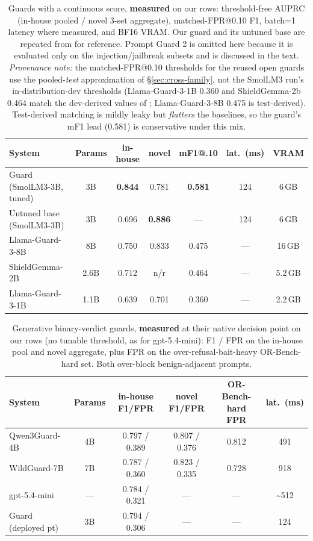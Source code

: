 \begin{table}[t]
\small\centering\setlength{\tabcolsep}{4pt}
\caption{Guards with a continuous score, \textbf{measured} on our rows: threshold-free AUPRC (in-house pooled / novel 3-set aggregate), matched-FPR@0.10 F1, batch=1 latency where measured, and BF16 VRAM. Our guard and its untuned base are repeated from  for reference. Prompt Guard 2 is omitted here because it is evaluated only on the injection/jailbreak subsets and is discussed in the text. \emph{Provenance note:} the matched-FPR@0.10 thresholds for the reused open guards use the pooled-\emph{test} approximation of \S\ref{sec:cross-family}, not the SmolLM3 run's in-distribution-dev thresholds (Llama-Guard-3-1B 0.360 and ShieldGemma-2b 0.464 match the dev-derived values of ; Llama-Guard-3-8B 0.475 is test-derived). Test-derived matching is mildly leaky but \emph{flatters} the baselines, so the guard's mF1 lead (0.581) is conservative under this mix.}
\label{tab:gr-auprc}
\begin{tabular}{lcccccc}
\toprule
System & Params & in-house & novel & mF1@.10 & lat.\ (ms) & VRAM \\
\midrule
Guard (SmolLM3-3B, tuned) & 3B & \textbf{0.844} & 0.781 & \textbf{0.581} & 124 & 6\,GB \\
Untuned base (SmolLM3-3B) & 3B & 0.696 & \textbf{0.886} & --- & 124 & 6\,GB \\
Llama-Guard-3-8B          & 8B & 0.750 & 0.833 & 0.475 & --- & 16\,GB \\
ShieldGemma-2B            & 2.6B & 0.712 & n/r & 0.464 & --- & 5.2\,GB \\
Llama-Guard-3-1B          & 1.1B & 0.639 & 0.701 & 0.360 & --- & 2.2\,GB \\
\bottomrule
\end{tabular}
\end{table}

\begin{table}[t]
\small\centering\setlength{\tabcolsep}{4pt}
\caption{Generative binary-verdict guards, \textbf{measured} at their native decision point on our rows (no tunable threshold, as for gpt-5.4-mini): F1 / FPR on the in-house pool and novel aggregate, plus FPR on the over-refusal-bait-heavy OR-Bench-hard set. Both over-block benign-adjacent prompts.}
\label{tab:gr-native}
\begin{tabular}{lccccc}
\toprule
System & Params & in-house F1/FPR & novel F1/FPR & OR-Bench-hard FPR & lat.\ (ms) \\
\midrule
Qwen3Guard-4B & 4B & 0.797 / 0.389 & 0.807 / 0.376 & 0.812 & 491 \\
WildGuard-7B  & 7B & 0.787 / 0.360 & 0.823 / 0.335 & 0.728 & 918 \\
gpt-5.4-mini  & --- & 0.784 / 0.321 & --- & --- & \textasciitilde{}512 \\
Guard (deployed pt) & 3B & 0.794 / 0.306 & --- & --- & 124 \\
\bottomrule
\end{tabular}
\end{table}

